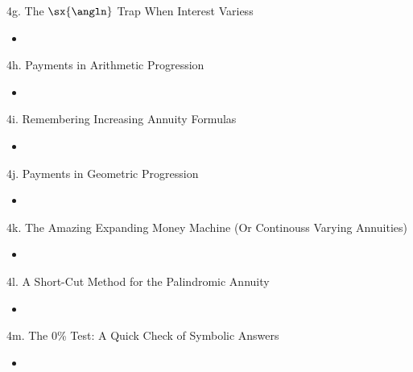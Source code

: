\begin{CHPT_SUMM_AUTO}[label = {L.-4g}]{4g. The $\sx{\angln}$ Trap When Interest Variess}
	\begin{itemize}
		\item	
	\end{itemize}
\end{CHPT_SUMM_AUTO}

\begin{CHPT_SUMM_AUTO}[label = {L.-4h}]{4h. Payments in Arithmetic Progression}
	\begin{itemize}
		\item	
	\end{itemize}
\end{CHPT_SUMM_AUTO}

\begin{CHPT_SUMM_AUTO}[label = {L.-4i}]{4i. Remembering Increasing Annuity Formulas}
	\begin{itemize}
		\item	
	\end{itemize}
\end{CHPT_SUMM_AUTO}

\begin{CHPT_SUMM_AUTO}[label = {L.-4j}]{4j. Payments in Geometric Progression}
	\begin{itemize}
		\item	
	\end{itemize}
\end{CHPT_SUMM_AUTO}

\begin{CHPT_SUMM_AUTO}[label = {L.-4k}]{4k. The Amazing Expanding Money Machine (Or Continouss Varying Annuities)}
	\begin{itemize}
		\item	
	\end{itemize}
\end{CHPT_SUMM_AUTO}

\begin{CHPT_SUMM_AUTO}[label = {L.-4l}]{4l. A Short-Cut Method for the Palindromic Annuity}
	\begin{itemize}
		\item	
	\end{itemize}
\end{CHPT_SUMM_AUTO}

\begin{CHPT_SUMM_AUTO}[label = {L.-4m}]{4m. The 0\% Test: A Quick Check of Symbolic Answers}
	\begin{itemize}
		\item	
	\end{itemize}
\end{CHPT_SUMM_AUTO}


